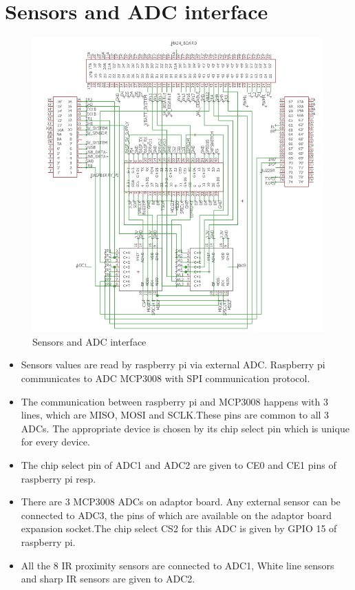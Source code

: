 \documentclass[a4paper,12pt,oneside]{book}
\begin{document}
\section{\textbf{Sensors and ADC interface}}
\begin{figure}[h]
	\includegraphics[width=1\textwidth]{adc}
	\caption{Sensors and ADC interface}
\end{figure}
\hfill
\begin{itemize}
	\item {Sensors values are read by raspberry pi via external ADC. Raspberry pi communicates to ADC MCP3008 with SPI communication protocol.}
	\item {The communication between raspberry pi and MCP3008 happens with 3 lines, which are MISO, MOSI and SCLK.These pins are common to all 3 ADCs. The appropriate device is chosen by its chip select pin which is unique for every device.}
	\item {The chip select pin of ADC1 and ADC2 are given to CE0 and CE1 pins of raspberry pi resp.}
	\item {There are 3 MCP3008 ADCs on adaptor board. Any external sensor can be connected to ADC3, the pins of which are available on the adaptor board expansion socket.The chip select CS2 for this ADC is given by GPIO 15 of raspberry pi.}
	\item {All the 8 IR proximity sensors are connected to ADC1, White line sensors and sharp IR sensors are given to ADC2.}\\
\end{itemize}
\end{document}
